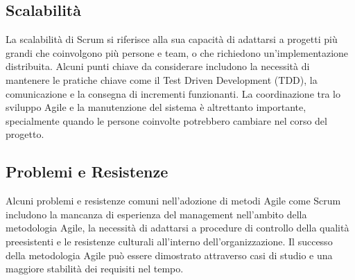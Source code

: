 \subsection{Scalabilità}
La scalabilità di Scrum si riferisce alla sua capacità di adattarsi a progetti più grandi che coinvolgono più persone e team,
o che richiedono un'implementazione distribuita. Alcuni punti chiave da considerare includono la necessità di mantenere le pratiche
chiave come il Test Driven Development (TDD), la comunicazione e la consegna di incrementi funzionanti. La coordinazione tra lo
sviluppo Agile e la manutenzione del sistema è altrettanto importante, specialmente quando le persone coinvolte potrebbero cambiare
nel corso del progetto.

\subsection{Problemi e Resistenze}
Alcuni problemi e resistenze comuni nell'adozione di metodi Agile come Scrum includono la mancanza di esperienza del management nell'ambito
della metodologia Agile, la necessità di adattarsi a procedure di controllo della qualità preesistenti e le resistenze culturali all'interno
dell'organizzazione. Il successo della metodologia Agile può essere dimostrato attraverso casi di studio e una maggiore stabilità dei requisiti
nel tempo.



